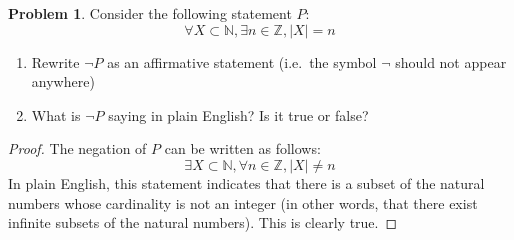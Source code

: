 \documentclass[11pt]{article}
\theoremstyle{definition}
\newtheorem{problem}{Problem}
\begin{document}
\begin{problem}
  Consider the following statement $P$:
  \begin{equation*} \forall X \subset \mathbb{N}, \exists n \in \mathbb{Z}, \lvert X \rvert = n \end{equation*}
  \begin{enumerate}
  \item Rewrite $\lnot P$ as an affirmative statement (i.e.~the symbol $\lnot$ should not appear anywhere)
  \item What is $\lnot P$ saying in plain English?  Is it true or false?
  \end{enumerate}
\end{problem}
\begin{proof}
  The negation of $P$ can be written as follows:
  \begin{equation*} \exists X \subset \mathbb{N}, \forall n \in \mathbb{Z}, \vert X \rvert \neq n \end{equation*}
  In plain English, this statement indicates that there is a subset of the natural numbers whose cardinality is not an
  integer (in other words, that there exist infinite subsets of the natural numbers).  This is clearly true.
\end{proof}
\end{document}
